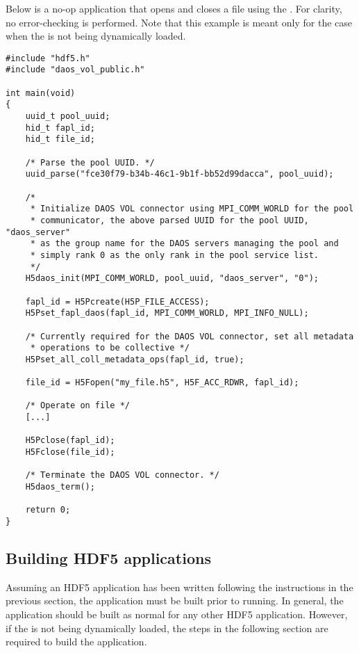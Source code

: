 \documentclass[../users_guide.tex]{subfiles}
\begin{document}
Below is a no-op application that opens and closes a file using the \dvc{}.
For clarity, no error-checking is performed. Note that this example is
meant only for the case when the \dvc{} is not being dynamically loaded.

\begin{verbatim}
#include "hdf5.h"
#include "daos_vol_public.h"

int main(void)
{
    uuid_t pool_uuid;
    hid_t fapl_id;
    hid_t file_id;

    /* Parse the pool UUID. */
    uuid_parse("fce30f79-b34b-46c1-9b1f-bb52d99dacca", pool_uuid);

    /* 
     * Initialize DAOS VOL connector using MPI_COMM_WORLD for the pool
     * communicator, the above parsed UUID for the pool UUID, "daos_server"
     * as the group name for the DAOS servers managing the pool and
     * simply rank 0 as the only rank in the pool service list.
     */
    H5daos_init(MPI_COMM_WORLD, pool_uuid, "daos_server", "0");

    fapl_id = H5Pcreate(H5P_FILE_ACCESS);
    H5Pset_fapl_daos(fapl_id, MPI_COMM_WORLD, MPI_INFO_NULL);

    /* Currently required for the DAOS VOL connector, set all metadata
     * operations to be collective */
    H5Pset_all_coll_metadata_ops(fapl_id, true); 

    file_id = H5Fopen("my_file.h5", H5F_ACC_RDWR, fapl_id);

    /* Operate on file */
    [...]

    H5Pclose(fapl_id);
    H5Fclose(file_id);

    /* Terminate the DAOS VOL connector. */
    H5daos_term();

    return 0;
}
\end{verbatim}

\subsection{Building HDF5 \dvc{} applications}

Assuming an HDF5 application has been written following the instructions in the previous section, the application must be built prior to running. In general, the
application should be built as normal for any other HDF5 application. However,
if the \dvc{} is not being dynamically loaded, the steps in the following section are required to build the application.
\end{document}
